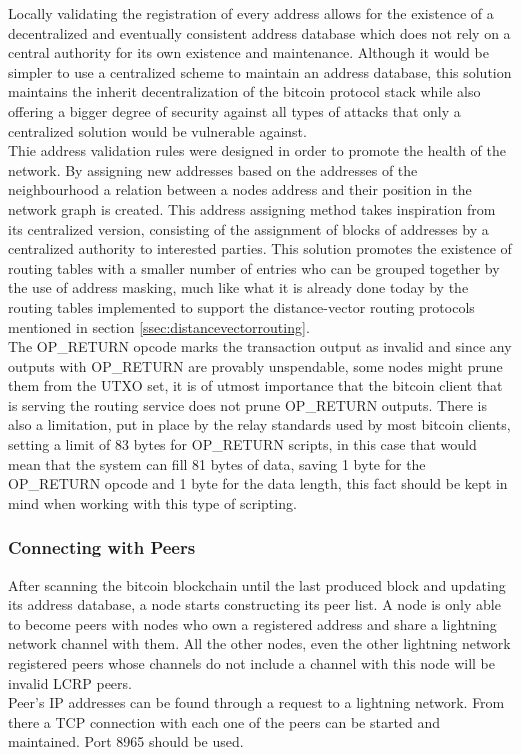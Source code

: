 Locally validating the registration of every address allows for the existence of a decentralized and eventually consistent address database which does not rely on a central authority for its own existence and maintenance. Although it would be simpler to use a centralized scheme to maintain an address database, this solution maintains the inherit decentralization of the bitcoin protocol stack while also offering a bigger degree of security against all types of attacks that only a centralized solution would be vulnerable against. \\
Thie address validation rules were designed in order to promote the health of the network. By assigning new addresses based on the addresses of the neighbourhood a relation between a nodes address and their position in the network graph is created. This address assigning method takes inspiration from its centralized version, consisting of the assignment of blocks of addresses by a centralized authority to interested parties. This solution promotes the existence of routing tables with a smaller number of entries who can be grouped together by the use of address masking, much like what it is already done today by the routing tables implemented to support the distance-vector routing protocols mentioned in section \ref{ssec:distancevectorrouting}. \\
The OP\_RETURN opcode marks the transaction output as invalid and since any outputs with OP\_RETURN are provably unspendable, some nodes might prune them from the UTXO set, it is of utmost importance that the bitcoin client that is serving the routing service does not prune OP\_RETURN outputs. There is also a limitation, put in place by the relay standards used by most bitcoin clients, setting a limit of 83 bytes for OP\_RETURN scripts, in this case that would mean that the system can fill 81 bytes of data, saving 1 byte for the OP\_RETURN opcode and 1 byte for the data length, this fact should be kept in mind when working with this type of scripting.

\subsubsection{Connecting with Peers}

After scanning the bitcoin blockchain until the last produced block and updating its address database, a node starts constructing its peer list. A node is only able to become peers with nodes who own a registered address and share a lightning network channel with them. All the other nodes, even the other lightning network registered peers whose channels do not include a channel with this node will be invalid LCRP peers. \\
Peer's IP addresses can be found through a request to a lightning network. From there a TCP connection with each one of the peers can be started and maintained. Port 8965 should be used.

